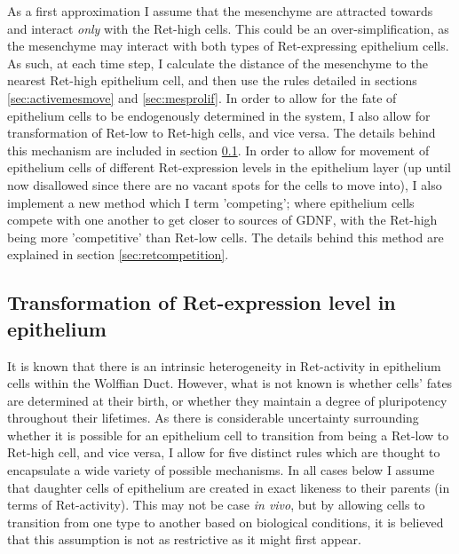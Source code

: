 \documentclass[pdftex,10pt,a4paper]{article}
\begin{document}
As a first approximation I assume that the mesenchyme are attracted towards and interact \textit{only} with the Ret-high cells. This could be an over-simplification, as the mesenchyme may interact with both types of Ret-expressing epithelium cells. As such, at each time step, I calculate the distance of the mesenchyme to the nearest Ret-high epithelium cell, and then use the rules detailed in sections \ref{sec:activemesmove} and \ref{sec:mesprolif}. In order to allow for the fate of epithelium cells to be endogenously determined in the system, I also allow for transformation of Ret-low to Ret-high cells, and vice versa. The details behind this mechanism are included in section \ref{sec:rettransform}. In order to allow for movement of epithelium cells of different Ret-expression levels in the epithelium layer (up until now disallowed since there are no vacant spots for the cells to move into), I also implement a new method which I term 'competing'; where epithelium cells compete with one another to get closer to sources of GDNF, with the Ret-high being more 'competitive' than Ret-low cells. The details behind this method are explained in section \ref{sec:retcompetition}.

\subsection{Transformation of Ret-expression level in epithelium}\label{sec:rettransform}
It is known that there is an intrinsic heterogeneity in Ret-activity in epithelium cells within the Wolffian Duct. However, what is not known is whether cells' fates are determined at their birth, or whether they maintain a degree of pluripotency throughout their lifetimes. As there is considerable uncertainty surrounding whether it is possible for an epithelium cell to transition from being a Ret-low to Ret-high cell, and vice versa, I allow for five distinct rules which are thought to encapsulate a wide variety of possible mechanisms. In all cases below I assume that daughter cells of epithelium are created in exact likeness to their parents (in terms of Ret-activity). This may not be case \textit{in vivo}, but by allowing cells to transition from one type to another based on biological conditions, it is believed that this assumption is not as restrictive as it might first appear.
\end{document}
